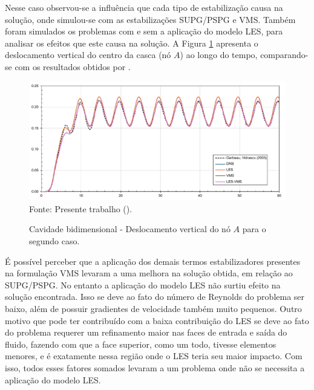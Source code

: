 Nesse caso observou-se a influência que cada tipo de estabilização causa na solução, onde simulou-se com as estabilizações SUPG/PSPG e VMS. Também foram simulados os problemas com e sem a aplicação do modelo LES, para analisar os efeitos que este causa na solução. A Figura \ref{fig:cavity2D-rescoarse} apresenta o deslocamento vertical do centro da casca (nó $A$) ao longo do tempo, comparando-se com os resultados obtidos por .

\begin{figure}[h!]
    \centering
    \caption{Cavidade bidimensional - Deslocamento vertical do nó $A$ para o segundo caso.}
    \includegraphics[width=\linewidth]{Figuras/FSI-Cavity2D/results-coarse.pdf}
    \\Fonte: Presente trabalho (\the\year).
    \label{fig:cavity2D-rescoarse}
\end{figure}

É possível perceber que a aplicação dos demais termos estabilizadores presentes na formulação VMS levaram a uma melhora na solução obtida, em relação ao SUPG/PSPG. No entanto a aplicação do modelo LES não surtiu efeito na solução encontrada. Isso se deve ao fato do número de Reynolds do problema ser baixo, além de possuir gradientes de velocidade também muito pequenos. Outro motivo que pode ter contribuído com a baixa contribuição do LES se deve ao fato do problema requerer um refinamento maior nas faces de entrada e saída do fluido, fazendo com que a face superior, como um todo, tivesse elementos menores, e é exatamente nessa região onde o LES teria seu maior impacto. Com isso, todos esses fatores somados levaram a um problema onde não se necessita a aplicação do modelo LES.

